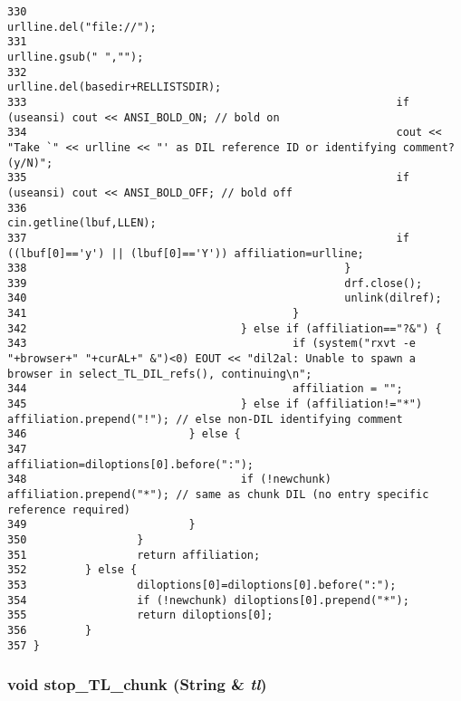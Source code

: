 \begin{verbatim}
330                                                         urlline.del("file://");
331                                                         urlline.gsub(" ","");
332                                                         urlline.del(basedir+RELLISTSDIR);
333                                                         if (useansi) cout << ANSI_BOLD_ON; // bold on
334                                                         cout << "Take `" << urlline << "' as DIL reference ID or identifying comment? (y/N)";
335                                                         if (useansi) cout << ANSI_BOLD_OFF; // bold off
336                                                         cin.getline(lbuf,LLEN);
337                                                         if ((lbuf[0]=='y') || (lbuf[0]=='Y')) affiliation=urlline;
338                                                 }
339                                                 drf.close();
340                                                 unlink(dilref);
341                                         }
342                                 } else if (affiliation=="?&") {
343                                         if (system("rxvt -e "+browser+" "+curAL+" &")<0) EOUT << "dil2al: Unable to spawn a browser in select_TL_DIL_refs(), continuing\n";
344                                         affiliation = "";
345                                 } else if (affiliation!="*") affiliation.prepend("!"); // else non-DIL identifying comment
346                         } else {
347                                 affiliation=diloptions[0].before(":");
348                                 if (!newchunk) affiliation.prepend("*"); // same as chunk DIL (no entry specific reference required)
349                         }
350                 }
351                 return affiliation;
352         } else {
353                 diloptions[0]=diloptions[0].before(":");
354                 if (!newchunk) diloptions[0].prepend("*");
355                 return diloptions[0];
356         }
357 }
\end{verbatim}\normalsize 
{}
\subsubsection{\setlength{\rightskip}{0pt plus 5cm}void stop\_\-TL\_\-chunk ({\bf String} \& {\em tl})}\label{tladmin_8cc_a6}




